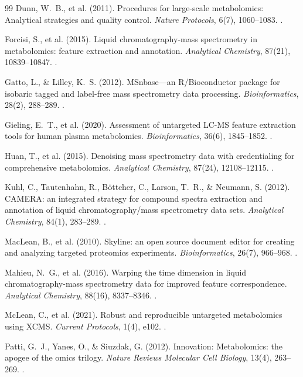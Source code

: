 \documentclass[11pt,twoside,openright]{book}
\begin{document}
\begin{thebibliography}{99}
Dunn, W.~B., et al. (2011). Procedures for large-scale metabolomics: Analytical strategies and quality control. \textit{Nature Protocols}, 6(7), 1060--1083. .

Forcisi, S., et al. (2015). Liquid chromatography-mass spectrometry in metabolomics: feature extraction and annotation. \textit{Analytical Chemistry}, 87(21), 10839--10847. .

Gatto, L., \& Lilley, K.~S. (2012). MSnbase---an R/Bioconductor package for isobaric tagged and label-free mass spectrometry data processing. \textit{Bioinformatics}, 28(2), 288--289. .

Gieling, E.~T., et al. (2020). Assessment of untargeted LC-MS feature extraction tools for human plasma metabolomics. \textit{Bioinformatics}, 36(6), 1845--1852. .

Huan, T., et al. (2015). Denoising mass spectrometry data with credentialing for comprehensive metabolomics. \textit{Analytical Chemistry}, 87(24), 12108--12115. .

Kuhl, C., Tautenhahn, R., B\"ottcher, C., Larson, T.~R., \& Neumann, S. (2012). CAMERA: an integrated strategy for compound spectra extraction and annotation of liquid chromatography/mass spectrometry data sets. \textit{Analytical Chemistry}, 84(1), 283--289. .

MacLean, B., et al. (2010). Skyline: an open source document editor for creating and analyzing targeted proteomics experiments. \textit{Bioinformatics}, 26(7), 966--968. .

Mahieu, N.~G., et al. (2016). Warping the time dimension in liquid chromatography-mass spectrometry data for improved feature correspondence. \textit{Analytical Chemistry}, 88(16), 8337--8346. .

McLean, C., et al. (2021). Robust and reproducible untargeted metabolomics using XCMS. \textit{Current Protocols}, 1(4), e102. .

Patti, G.~J., Yanes, O., \& Siuzdak, G. (2012). Innovation: Metabolomics: the apogee of the omics trilogy. \textit{Nature Reviews Molecular Cell Biology}, 13(4), 263--269. .


\end{thebibliography}
\end{document}
